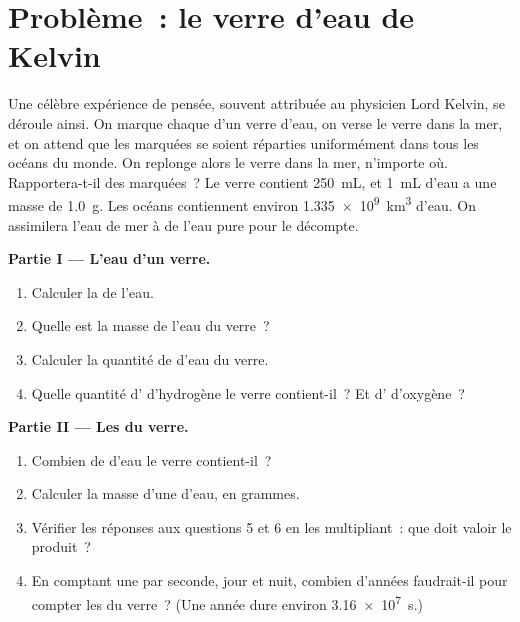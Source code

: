 \section{Problème~: le verre d'eau de Kelvin}

\begin{problem}
\label{pb:g10:the-mole:1}
Une célèbre expérience de pensée, souvent attribuée au physicien Lord
Kelvin, se déroule ainsi. On marque chaque  d'un verre d'eau, on
verse le verre dans la mer, et on attend que les  marquées se
soient réparties uniformément dans tous les océans du monde. On replonge
alors le verre dans la mer, n'importe où. Rapportera-t-il des 
marquées~? Le verre contient \qty{250}{mL}, et \qty{1}{mL} d'eau a une
masse de \qty{1.0}{g}. Les océans contiennent environ
\qty{1.335e9}{km^3} d'eau. On assimilera l'eau de mer à de l'eau pure
pour le décompte.

\medskip
\noindent\textbf{Partie I --- L'eau d'un verre.}
\begin{enumerate}
  \item Calculer la  de l'eau.
  \item Quelle est la masse de l'eau du verre~?
  \item Calculer la quantité de  d'eau du verre.
  \item Quelle quantité d' d'hydrogène le verre contient-il~? Et
        d' d'oxygène~?
\end{enumerate}

\medskip
\noindent\textbf{Partie II --- Les  du verre.}
\begin{enumerate}[resume]
  \item Combien de  d'eau le verre contient-il~?
  \item Calculer la masse d'une  d'eau, en grammes.
  \item Vérifier les réponses aux questions 5 et 6 en les multipliant~:
        que doit valoir le produit~?
  \item En comptant une  par seconde, jour et nuit, combien
        d'années faudrait-il pour compter les  du verre~? (Une
        année dure environ \qty{3.16e7}{s}.)
\end{enumerate}


\end{problem}

